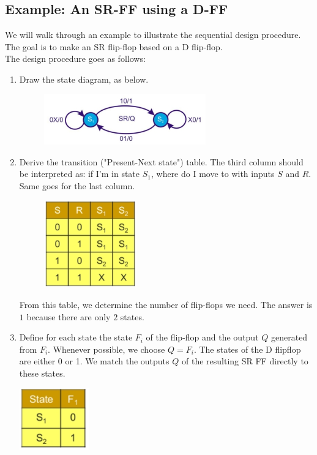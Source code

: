 \subsection{Example: An SR-FF using a D-FF}
We will walk through an example to illustrate the sequential design procedure. The goal is to make an SR flip-flop based on a D flip-flop.\\
The design procedure goes as follows:
\begin{enumerate}
	\item Draw the state diagram, as below. 
	\begin{figure}[h!]
		\centering
		\includegraphics[width=7cm]{figures/ch17/design6.jpg}
		\caption{}
		\label{fig:design6}
	\end{figure}
	\item Derive the transition ("Present-Next state") table. The third column should be interpreted as: if I'm in state $S_1$, where do I move to with inputs $S$ and $R$. Same goes for the last column.
	\begin{figure}[h!]
		\centering
		\includegraphics[width=4cm]{figures/ch17/design7.jpg}
		\caption{}
		\label{fig:design7}
	\end{figure}
	From this table, we determine the number of flip-flops we need. The answer is $1$ because there are only $2$ states.
	\item Define for each state the state $F_i$ of the flip-flop and the output $Q$ generated from $F_i$. Whenever possible, we choose $Q = F_i$. The states of the D flipflop are either 0 or 1. We match the outputs $Q$ of the resulting SR FF directly to these states.\\
	\begin{minipage}{.5\textwidth}
		\centering
		\includegraphics[width=3cm]{figures/ch17/design8.jpg}

\end{minipage}
\end{enumerate}
